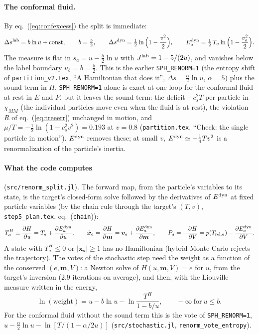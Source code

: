 \documentclass[11pt,aps,preprint,nofootinbib,superscriptaddress,tightenlines]{revtex4-2}
\def\st{\begin{equation}}
\def\stp{\end{equation}}
\def\Eq#1{eq.~(\ref{#1})}
\let\oldparagraph\paragraph
\renewcommand{\paragraph}{\par\bigskip\oldparagraph}
\begin{document}
\paragraph{The conformal fluid.}  By \Eq{eq:confexcess} the split is immediate:
\st
\Delta s^{\rm lab}=b\ln u+{\rm const},\qquad b=\tfrac52,\qquad
\Delta s^{\rm dyn}=\tfrac12\ln\Big(1-\frac{v^2}2\Big),\qquad E^{\rm dyn}_a=\tfrac12\,T_a\ln\Big(1-\frac{v_a^2}2\Big) .
\label{eq:splitconf}
\stp
The measure is flat in $s_a=u-\tfrac52\ln u$ with $J^{\rm lab}=1-5/(2u)$, and vanishes below the label boundary $u_b=b=\tfrac52$.  This is the
earlier \texttt{SPH\_RENORM=1} (the entropy shift of \nolinkurl{partition_v2.tex}, ``A Hamiltonian that does it'', $\Delta s=\tfrac\alpha2\ln u$, $\alpha=5$)
plus the sound term in $H$.  \texttt{SPH\_RENORM=1} alone is exact at one loop for the conformal fluid at rest in $E$ and $P$, but it leaves the sound
term: the deficit $-c_s^2T$ per particle in $\chi_{MM}$ (the individual particles move even when the fluid is at rest), the violation $R$ of
\Eq{eq:treeerr} unchanged in motion, and $\mu/T=-\tfrac12\ln(1-c_s^2v^2)=0.193$ at $v=0.8$ (\nolinkurl{partition.tex}, ``Check: the single particle
in motion'').  $E^{\rm dyn}$ removes these; at small $v$, $E^{\rm dyn}\simeq-\tfrac14Tv^2$ is a renormalization of the particle's inertia.

\paragraph{What the code computes} (\nolinkurl{src/renorm_split.jl}).  The forward map, from the particle's variables to its state, is the target's
closed-form solve followed by the derivatives of $E^{\rm dyn}$ at fixed particle variables (by the chain rule through the target's $(T,v)$,
\nolinkurl{step5_plan.tex}, eq.~(\texttt{chain})):
\st
T_a^H\equiv\frac{\partial H}{\partial u}=T_a+\frac{\partial E^{\rm dyn}_a}{\partial u},\qquad
\dot{\bm x}_a=\frac{\partial H}{\partial\bm m}=\bm v_a+\frac{\partial E^{\rm dyn}_a}{\partial\bm m},\qquad
P_a=-\frac{\partial H}{\partial V}=p(T_{{\rm rel},a})-\frac{\partial E^{\rm dyn}_a}{\partial V} .
\label{eq:fields}
\stp
A state with $T_a^H\le0$ or $|\dot{\bm x}_a|\ge1$ has no Hamiltonian (hybrid Monte Carlo rejects the trajectory).  The votes of the stochastic step need
the weight as a function of the conserved $(e,\bm m,V)$: a Newton solve of $H(u,\bm m,V)=e$ for $u$, from the target's inversion (2.9 iterations on
average), and then, with the Liouville measure written in the energy,
\st
\ln(\text{weight})=u-b\ln u-\ln\frac{T^H}{1-b/u},\qquad -\infty\ \text{for}\ u\le b .
\label{eq:vote}
\stp
For the conformal fluid without the sound term this is the vote of \texttt{SPH\_RENORM=1}, $u-\tfrac\alpha2\ln u-\ln[T/(1-\alpha/2u)]$
(\nolinkurl{src/stochastic.jl}, \texttt{renorm\_vote\_entropy}).
\end{document}
